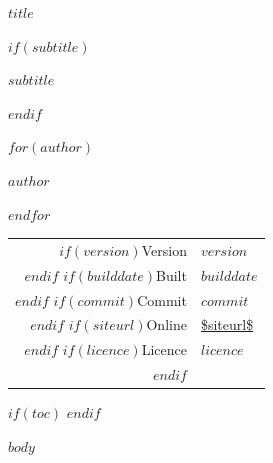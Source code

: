 \documentclass[11pt,a4paper]{article}
\begin{document}
\begin{titlepage}
\centering
\vspace*{4cm}

{\Huge\bfseries $title$\par}
$if(subtitle)$
\vspace{0.8cm}
{\Large $subtitle$\par}
$endif$

\vspace{2.5cm}
$for(author)$
{\large $author$\par}
\vspace{0.3cm}
$endfor$

\vfill

\begin{tabular}{rl}
$if(version)$Version & $version$ \\$endif$
$if(builddate)$Built & $builddate$ \\$endif$
$if(commit)$Commit & \texttt{$commit$} \\$endif$
$if(siteurl)$Online & \url{$siteurl$} \\$endif$
$if(licence)$Licence & $licence$ \\$endif$
\end{tabular}

\vspace{1cm}
\end{titlepage}

$if(toc)$
\hypersetup{linkcolor=black}
\setcounter{tocdepth}{$toc-depth$}
\tableofcontents
\clearpage
$endif$

$body$
\end{document}
